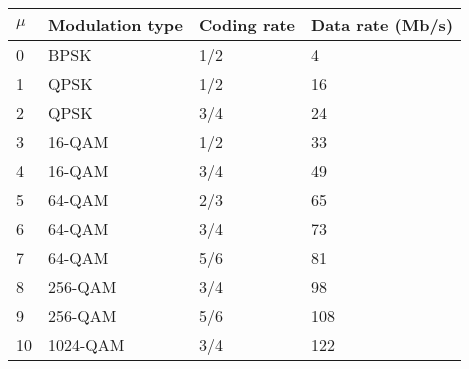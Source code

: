 \begin{tabular}{ l | l | l | l  }
\hline
  $\mu$ & Modulation type & Coding rate & Data rate (Mb/s)  \\ \hline
  0 & BPSK & 1/2 & 4 \\
  1 & QPSK & 1/2 & 16 \\
  2 & QPSK & 3/4 & 24 \\
  3 & 16-QAM & 1/2 & 33 \\
  4 & 16-QAM & 3/4 & 49 \\
  5 & 64-QAM & 2/3 & 65 \\
  6 & 64-QAM & 3/4 & 73 \\
  7 & 64-QAM & 5/6 & 81 \\
  8 & 256-QAM & 3/4 & 98 \\
  9 & 256-QAM & 5/6 & 108 \\
  10 & 1024-QAM & 3/4 & 122 \\
  \hline  
\end{tabular}